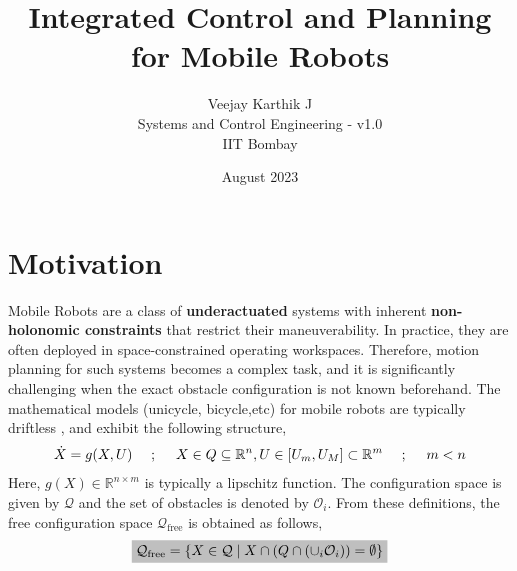 \documentclass{article}
\begin{document}
\title{Integrated Control and Planning for Mobile Robots}
\author{Veejay Karthik J\\
Systems and Control Engineering - v1.0\\
IIT Bombay}
\date{August 2023}


\maketitle

\section{Motivation}

Mobile Robots are a class of \textbf{underactuated} systems with inherent \textbf{non-holonomic constraints} that restrict their maneuverability. In practice, they are often deployed in space-constrained operating workspaces. Therefore, motion planning for such systems becomes a complex task, and it is significantly challenging when the exact obstacle configuration is not known beforehand. The mathematical models (unicycle, bicycle,etc) for mobile robots are typically driftless , and exhibit the following structure,
\begin{align}
\label{eqn:SystemDescription}
\centering
\dot{X} = g(X,U) \quad~;~\quad X \in Q \subseteq \mathbb{R}^n, U\in [U_m,U_M]\subset\mathbb{R}^m \quad~;~\quad m < n
\end{align}
Here, $g(X)\in \mathbb{R}^{n\times m}$ is typically a lipschitz function. The configuration space is given by $\mathcal{Q}$ and the set of obstacles is denoted by $\mathcal{O}_i$. From these definitions, the free configuration space $\mathcal{Q}_{\text{free}}$ is obtained as follows,
\begin{align}
\label{eqn:FreeWorkspaces}
\text{\colorbox{lightgray}{$\mathcal{Q}_{\text{free}} = \{X\in\mathcal{Q}\;|\; X\cap\left(Q\cap (\cup_i \mathcal{O}_i)\right) = \emptyset \}$}}
\end{align}
    
\end{document}
